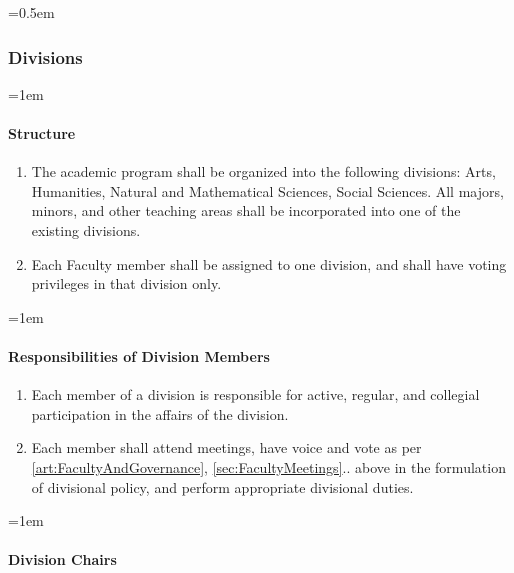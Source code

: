 \documentclass{manual}
\let\oldsubsubsection\subsubsection
\renewcommand\subsubsection{\leftskip=0.5em\oldsubsubsection}
\let\oldparagraph\paragraph
\renewcommand\paragraph{\leftskip=1em\oldparagraph}
\newcommand{\itemLevelA}{\alph*.}
\newcommand{\itemRefA}{\alph*}
\begin{document}
		\subsubsection{Divisions}\label{sub:Divisions}

			\paragraph{Structure}

				\begin{enumerate}[label=\itemLevelA,ref=\itemRefA]
				\item The academic program shall be organized into the following divisions: Arts, Humanities, Natural and Mathematical Sciences, Social Sciences. All majors, minors, and other teaching areas shall be incorporated into one of the existing divisions.
				\item Each Faculty member shall be assigned to one division, and shall have voting privileges in that division only.
				\end{enumerate}

			\paragraph{Responsibilities of Division Members}

				\begin{enumerate}[label=\itemLevelA,ref=\itemRefA]
				\item Each member of a division is responsible for active, regular, and collegial participation in the affairs of the division.
				\item Each member shall attend meetings, have voice and vote as per \cref{art:FacultyAndGovernance}, \cref{sec:FacultyMeetings}.. above in the formulation of divisional policy, and perform appropriate divisional duties.
				\end{enumerate}

			\paragraph{Division Chairs}\label{par:DivisionChairs}
\end{document}
